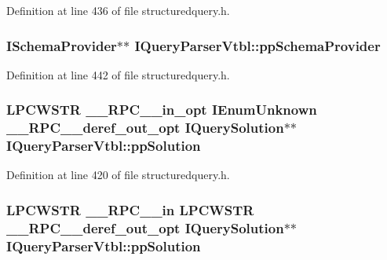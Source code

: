 Definition at line 436 of file structuredquery.\+h.

\subsubsection[{\texorpdfstring{pp\+Schema\+Provider}{ppSchemaProvider}}]{ {\bf I\+Schema\+Provider}$\ast$$\ast$ I\+Query\+Parser\+Vtbl\+::pp\+Schema\+Provider}\hypertarget{struct_i_query_parser_vtbl_a9eb2879f8e84e7020bf7b728ecdf8727}{}\label{struct_i_query_parser_vtbl_a9eb2879f8e84e7020bf7b728ecdf8727}


Definition at line 442 of file structuredquery.\+h.

\subsubsection[{\texorpdfstring{pp\+Solution}{ppSolution}}]{ {\bf L\+P\+C\+W\+S\+TR} {\bf \+\_\+\+\_\+\+R\+P\+C\+\_\+\+\_\+in\+\_\+opt} I\+Enum\+Unknown {\bf \+\_\+\+\_\+\+R\+P\+C\+\_\+\+\_\+deref\+\_\+out\+\_\+opt} {\bf I\+Query\+Solution}$\ast$$\ast$ I\+Query\+Parser\+Vtbl\+::pp\+Solution}\hypertarget{struct_i_query_parser_vtbl_ae0823488754101f09d55af482018e911}{}\label{struct_i_query_parser_vtbl_ae0823488754101f09d55af482018e911}


Definition at line 420 of file structuredquery.\+h.

\subsubsection[{\texorpdfstring{pp\+Solution}{ppSolution}}]{ {\bf L\+P\+C\+W\+S\+TR} {\bf \+\_\+\+\_\+\+R\+P\+C\+\_\+\+\_\+in} {\bf L\+P\+C\+W\+S\+TR} {\bf \+\_\+\+\_\+\+R\+P\+C\+\_\+\+\_\+deref\+\_\+out\+\_\+opt} {\bf I\+Query\+Solution}$\ast$$\ast$ I\+Query\+Parser\+Vtbl\+::pp\+Solution}\hypertarget{struct_i_query_parser_vtbl_ae319ad9bf659a902ec1ca90162961e52}{}\label{struct_i_query_parser_vtbl_ae319ad9bf659a902ec1ca90162961e52}


